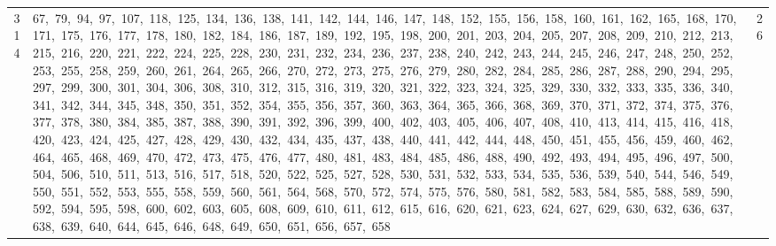 \begin{longtable}{c|p{}|r}
314 & 67,\ 79,\ 94,\ 97,\ 107,\ 118,\ 125,\ 134,\ 136,\ 138,\ 141,\ 142,\ 144,\ 146,\ 147,\ 148,\ 152,\ 155,\ 156,\ 158,\ 160,\ 161,\ 162,\ 165,\ 168,\ 170,\ 171,\ 175,\ 176,\ 177,\ 178,\ 180,\ 182,\ 184,\ 186,\ 187,\ 189,\ 192,\ 195,\ 198,\ 200,\ 201,\ 203,\ 204,\ 205,\ 207,\ 208,\ 209,\ 210,\ 212,\ 213,\ 215,\ 216,\ 220,\ 221,\ 222,\ 224,\ 225,\ 228,\ 230,\ 231,\ 232,\ 234,\ 236,\ 237,\ 238,\ 240,\ 242,\ 243,\ 244,\ 245,\ 246,\ 247,\ 248,\ 250,\ 252,\ 253,\ 255,\ 258,\ 259,\ 260,\ 261,\ 264,\ 265,\ 266,\ 270,\ 272,\ 273,\ 275,\ 276,\ 279,\ 280,\ 282,\ 284,\ 285,\ 286,\ 287,\ 288,\ 290,\ 294,\ 295,\ 297,\ 299,\ 300,\ 301,\ 304,\ 306,\ 308,\ 310,\ 312,\ 315,\ 316,\ 319,\ 320,\ 321,\ 322,\ 323,\ 324,\ 325,\ 329,\ 330,\ 332,\ 333,\ 335,\ 336,\ 340,\ 341,\ 342,\ 344,\ 345,\ 348,\ 350,\ 351,\ 352,\ 354,\ 355,\ 356,\ 357,\ 360,\ 363,\ 364,\ 365,\ 366,\ 368,\ 369,\ 370,\ 371,\ 372,\ 374,\ 375,\ 376,\ 377,\ 378,\ 380,\ 384,\ 385,\ 387,\ 388,\ 390,\ 391,\ 392,\ 396,\ 399,\ 400,\ 402,\ 403,\ 405,\ 406,\ 407,\ 408,\ 410,\ 413,\ 414,\ 415,\ 416,\ 418,\ 420,\ 423,\ 424,\ 425,\ 427,\ 428,\ 429,\ 430,\ 432,\ 434,\ 435,\ 437,\ 438,\ 440,\ 441,\ 442,\ 444,\ 448,\ 450,\ 451,\ 455,\ 456,\ 459,\ 460,\ 462,\ 464,\ 465,\ 468,\ 469,\ 470,\ 472,\ 473,\ 475,\ 476,\ 477,\ 480,\ 481,\ 483,\ 484,\ 485,\ 486,\ 488,\ 490,\ 492,\ 493,\ 494,\ 495,\ 496,\ 497,\ 500,\ 504,\ 506,\ 510,\ 511,\ 513,\ 516,\ 517,\ 518,\ 520,\ 522,\ 525,\ 527,\ 528,\ 530,\ 531,\ 532,\ 533,\ 534,\ 535,\ 536,\ 539,\ 540,\ 544,\ 546,\ 549,\ 550,\ 551,\ 552,\ 553,\ 555,\ 558,\ 559,\ 560,\ 561,\ 564,\ 568,\ 570,\ 572,\ 574,\ 575,\ 576,\ 580,\ 581,\ 582,\ 583,\ 584,\ 585,\ 588,\ 589,\ 590,\ 592,\ 594,\ 595,\ 598,\ 600,\ 602,\ 603,\ 605,\ 608,\ 609,\ 610,\ 611,\ 612,\ 615,\ 616,\ 620,\ 621,\ 623,\ 624,\ 627,\ 629,\ 630,\ 632,\ 636,\ 637,\ 638,\ 639,\ 640,\ 644,\ 645,\ 646,\ 648,\ 649,\ 650,\ 651,\ 656,\ 657,\ 658 & 26 \\

\end{longtable}
